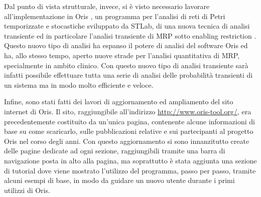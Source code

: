 \documentclass{article}
\begin{document}
    Dal punto di vista strutturale, invece, si è visto necessario lavorare all'implementazione in Oris \cite{bucci2010oris}, un programma per l'analisi di reti di Petri temporizzate e stocastiche sviluppato da STLab, di una nuova tecnica di analisi transiente ed in particolare l'analisi transiente di MRP sotto enabling restriction \cite{german1995transient}. Questo nuovo tipo di analisi ha espanso il potere di analisi del software Oris ed ha, allo stesso tempo, aperto nuove strade per l'analisi quantitativa di MRP, specialmente in ambito clinico. Con questo nuovo tipo di analisi transiente sarà infatti possibile effettuare tutta una serie di analisi delle probabilità transienti di un sistema ma in modo molto efficiente e veloce.
    
    Infine, sono stati fatti dei lavori di aggiornamento ed ampliamento del sito internet di Oris. Il sito, raggiungibile all'indirizzo \url{http://www.oris-tool.org/}, era precedentemente costituito da un'unica pagina, contenente alcune informazioni di base su come scaricarlo, sulle pubblicazioni relative e sui partecipanti al progetto Oris nel corso degli anni. Con questo aggiornamento si sono innanzitutto create delle pagine dedicate ad ogni sezione, raggiungibili tramite una barra di navigazione posta in alto alla pagina, ma soprattutto è stata aggiunta una sezione di tutorial dove viene mostrato l'utilizzo del programma, passo per passo, tramite alcuni esempi di base, in modo da guidare un nuovo utente durante i primi utilizzi di Oris.
    
    \clearpage
    
	
	
\end{document}
